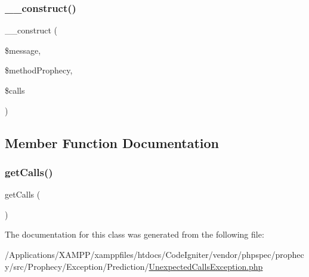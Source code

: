 \subsubsection{\texorpdfstring{\+\_\+\+\_\+construct()}{\_\_construct()}}
{\footnotesize\ttfamily \+\_\+\+\_\+construct (\begin{DoxyParamCaption}\item[{}]{\$message,  }\item[{\mbox{\hyperlink{class_prophecy_1_1_prophecy_1_1_method_prophecy}{Method\+Prophecy}}}]{\$method\+Prophecy,  }\item[{array}]{\$calls }\end{DoxyParamCaption})}



\subsection{Member Function Documentation}
\mbox{\label{class_prophecy_1_1_exception_1_1_prediction_1_1_unexpected_calls_exception_a52b6d4f7073bed7e7a59451b02d8f8c5}} 
\subsubsection{\texorpdfstring{get\+Calls()}{getCalls()}}
{\footnotesize\ttfamily get\+Calls (\begin{DoxyParamCaption}{ }\end{DoxyParamCaption})}



The documentation for this class was generated from the following file\+:\begin{DoxyCompactItemize}
\item 
/\+Applications/\+X\+A\+M\+P\+P/xamppfiles/htdocs/\+Code\+Igniter/vendor/phpspec/prophecy/src/\+Prophecy/\+Exception/\+Prediction/\mbox{\hyperlink{_unexpected_calls_exception_8php}{Unexpected\+Calls\+Exception.\+php}}\end{DoxyCompactItemize}

